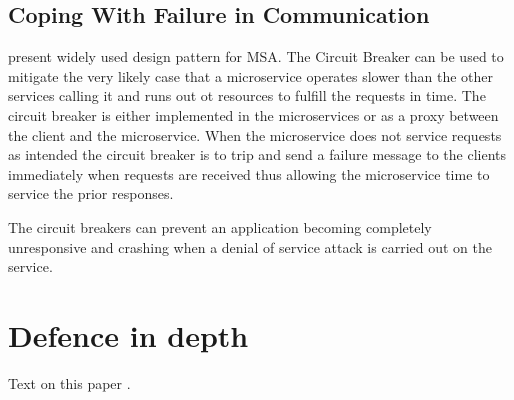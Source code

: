 \subsection{Coping With Failure in Communication}
\begin{sloppypar}
    \citet{DBLP:journals/corr/MontesiW16} present widely used design pattern for MSA.
    The Circuit Breaker can be used to mitigate the very likely case that a 
    microservice operates slower than the other services calling it and 
    runs out ot resources to fulfill the requests in time. The circuit breaker
    is either implemented in the microservices or as a proxy between the client 
    and the microservice. When the microservice does not service requests as 
    intended the circuit breaker is to trip and send a failure message to the 
    clients immediately when requests are received thus allowing the 
    microservice time to service the prior responses.
\end{sloppypar}
\begin{sloppypar}
    The circuit breakers can prevent an application becoming completely 
    unresponsive and crashing when a denial of service attack is carried out on 
    the service.
\end{sloppypar}




\section{Defence in depth}
\begin{sloppypar}
    Text on this paper \citep{defdepau}.
\end{sloppypar}
\begin{sloppypar}
\end{sloppypar}
\begin{sloppypar}
\end{sloppypar}


